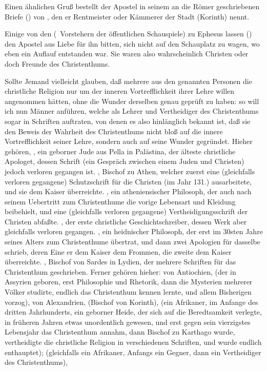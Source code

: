 \begin{aufza}
\item Einen ähnlichen Gruß bestellt der Apostel in seinem an die Römer geschriebenen Briefe () von , den er Rentmeister oder Kämmerer der Stadt (Korinth) nennt.
\item Einige von den  (\di\ Vorstehern der öffentlichen Schauspiele) zu Ephesus lassen () den Apostel  aus Liebe für ihn bitten, sich nicht auf den Schauplatz zu wagen, wo eben ein Auflauf entstanden war. Sie waren also wahrscheinlich Christen oder doch Freunde des Christenthums.
\item Sollte Jemand vielleicht glauben, daß mehrere aus den genannten Personen die christliche Religion nur um der inneren Vortrefflichkeit ihrer Lehre willen angenommen hätten, ohne die Wunder derselben genau geprüft zu haben: so will ich nun Männer anführen, welche als Lehrer und Vertheidiger des Christenthums sogar in Schriften auftraten, von denen es also hinlänglich bekannt ist, daß sie den Beweis der Wahrheit des Christenthums nicht bloß auf die innere Vortrefflichkeit seiner Lehre, sondern auch auf seine Wunder gegründet. Hieher gehören, , ein geborner Jude aus Pella in Palästina, der älteste christliche Apologet, dessen Schrift (ein Gespräch zwischen einem Juden und Christen) jedoch verloren gegangen ist. , Bischof zu Athen, welcher zuerst eine (gleichfalls verloren gegangene) Schutzschrift für die Christen (im Jahr 131.) ausarbeitete, und sie dem Kaiser  überreichte. , ein atheniensischer Philosoph, der auch nach seinem Uebertritt zum Christenthume die vorige Lebensart und Kleidung beibehielt, und eine (gleichfalls verloren gegangene) Vertheidigungsschrift der Christen abfaßte. , der erste christliche Geschichtschreiber, dessen Werk aber gleichfalls verloren gegangen. , ein heidnischer Philosoph, der erst im 30sten Jahre seines Alters zum Christenthume übertrat, und dann zwei Apologien für dasselbe schrieb, deren Eine er dem Kaiser  dem Frommen, die zweite dem Kaiser~\  überreichte. , Bischof von Sardes in Lydien, der mehrere Schriften für das Christenthum geschrieben. Ferner gehören hieher:  von Antiochien,  (der in Assyrien geboren, erst Philosophie und Rhetorik, dann die Mysterien mehrerer Völker studirte, endlich das Christenthum kennen lernte, und allem Bisherigen vorzog),  von Alexandrien,  (Bischof von Korinth),  (ein Afrikaner, im Anfange des dritten Jahrhunderts, ein geborner Heide, der sich auf die Beredtsamkeit verlegte, in früheren Jahren etwas unordentlich gewesen, und erst gegen sein vierzigstes Lebensjahr das Christenthum annahm, dann Bischof zu Karthago wurde, vertheidigte die christliche Religion in verschiedenen Schriften, und wurde endlich enthauptet);  (gleichfalls ein Afrikaner, Anfangs ein Gegner, dann ein Vertheidiger des Christenthums), \umA\par 

\end{aufza}
